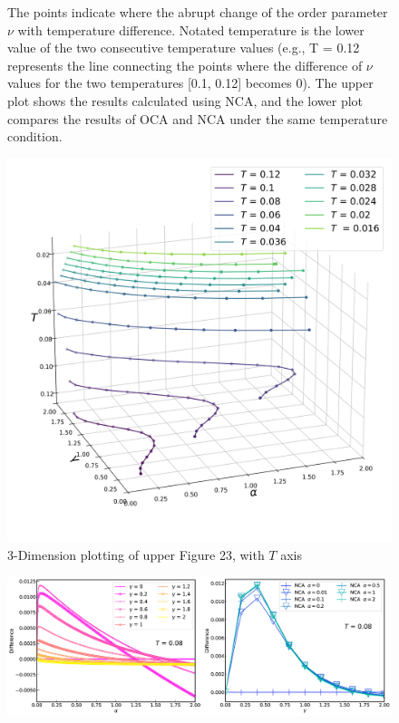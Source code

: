 \documentclass{article}[12pt]
\begin{document}
\begin{spacing}{1.5}
\begin{figure}[H]
  \caption{The points indicate where the abrupt change of the order parameter $\nu$ with temperature difference. 
  Notated temperature is the lower value of the two consecutive temperature values 
  (e.g., T = 0.12 represents the line connecting the points where the difference of $\nu$ values 
  for the two temperatures [0.1, 0.12] becomes 0). The upper plot shows the results calculated using NCA, 
  and the lower plot compares the results of OCA and NCA under the same temperature condition.}
  \label{2Dplot}
\end{figure}
\begin{figure}[H]
  \centerline{\includegraphics[width=17cm]{TexFigure/3dplot_Ns3_proj_20-1.png}}
  \caption{3-Dimension plotting of upper Figure 23, with $T$ axis}%
\end{figure}
\pagebreak
\begin{figure}[H]
  \vfill
  \centering
  \centerline{\includegraphics[width=17cm]{TexFigure/swap_fig.png}}

\end{figure}
\end{spacing}
\end{document}

